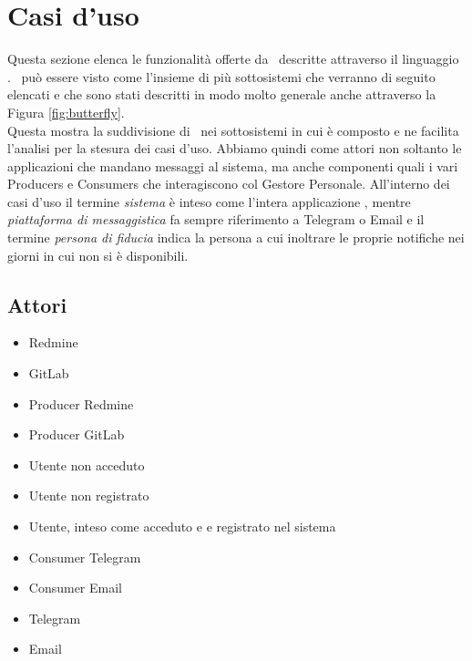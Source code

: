 \newpage
\section{Casi d'uso}\label{CasiDUso}
Questa sezione elenca le funzionalità offerte da \progetto\ descritte attraverso il linguaggio .
\progetto\ può essere visto come l'insieme di più sottosistemi che verranno di seguito elencati e che sono stati descritti in modo molto generale anche attraverso la Figura \ref{fig:butterfly}.\\
Questa mostra la suddivisione di \progetto\ nei sottosistemi in cui è composto e ne facilita l'analisi per la stesura dei casi d'uso.
Abbiamo quindi come attori non soltanto le applicazioni che mandano messaggi al sistema, ma anche componenti quali i vari Producers e Consumers che interagiscono col Gestore Personale.
All'interno dei casi d'uso il termine \textit{sistema} è inteso come l'intera applicazione \progetto, mentre \textit{piattaforma di messaggistica} fa sempre riferimento a Telegram o Email e il termine \textit{persona di fiducia} indica la persona a cui inoltrare le proprie notifiche nei giorni in cui non si è disponibili.
	
	\subsection{Attori}
	\begin{itemize}
		\item Redmine
		\item GitLab
		\item Producer Redmine
		\item Producer GitLab
		\item Utente non acceduto
		\item Utente non registrato
		\item Utente, inteso come acceduto e e registrato nel sistema
		\item Consumer Telegram
		\item Consumer Email
		\item Telegram
		\item Email
	\end{itemize}


